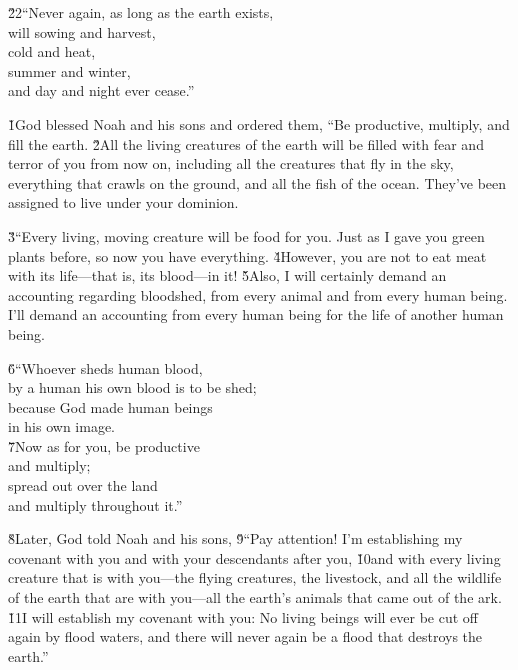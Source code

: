 \begin{poetry}
\poeml \v{22}``Never again, as long as the earth exists, \\
\poemll    will sowing and harvest, \\
\poeml cold and heat, \\
\poemll    summer and winter, \\
\poemlll       and day and night ever cease.''
\end{poetry}

\v{1}God blessed Noah and his sons and ordered them, ``Be productive, multiply, and fill the earth. \v{2}All the living creatures of the earth will be filled with fear and terror of you from now on, including all the creatures that fly in the sky, everything that crawls on the ground, and all the fish of the ocean. They've been assigned to live under your dominion.

\v{3}``Every living, moving creature will be food for you. Just as I gave you green plants before, so now you have everything. \v{4}However, you are not to eat meat with its life---that is, its blood---in it! \v{5}Also, I will certainly demand an accounting regarding bloodshed, from every animal and from every human being. I'll demand an accounting from every human being for the life of another human being.

\begin{poetry}
\poeml \v{6}``Whoever sheds human blood, \\
\poemll    by a human his own blood is to be shed; \\
\poeml because God made human beings \\
\poemll    in his own image. \\
\poeml \v{7}Now as for you, be productive \\
\poemll    and multiply; \\
\poeml spread out over the land \\
\poemll    and multiply throughout it.''
\end{poetry}

\v{8}Later, God told Noah and his sons, \v{9}``Pay attention! I'm establishing my covenant with you and with your descendants after you, \v{10}and with every living creature that is with you---the flying creatures, the livestock, and all the wildlife of the earth that are with you---all the earth's animals that came out of the ark. \v{11}I will establish my covenant with you: No living beings will ever be cut off again by flood waters, and there will never again be a flood that destroys the earth.''

